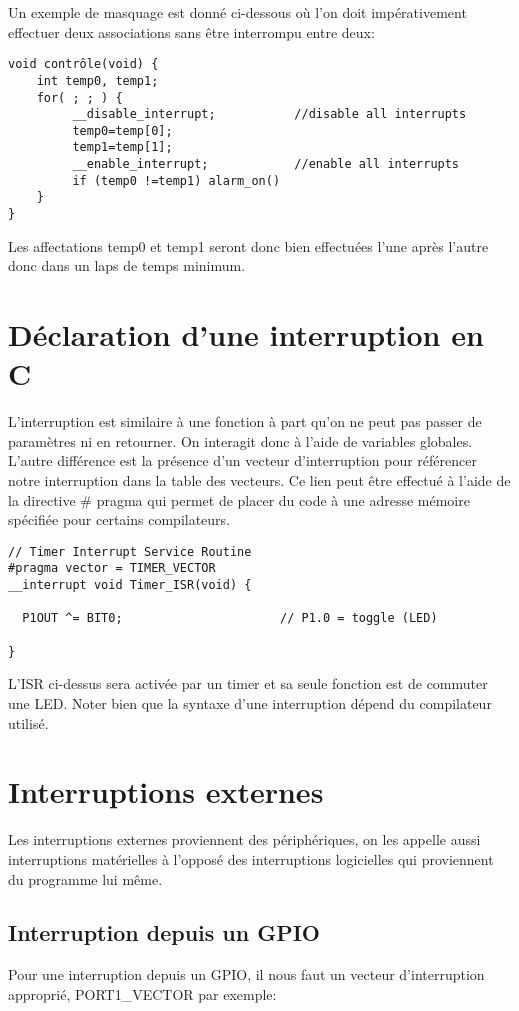 Un exemple de masquage est donné ci-dessous où l'on doit impérativement effectuer deux associations sans être interrompu entre deux:

\lstset{style=customc}
\begin{lstlisting}
void contrôle(void) {
    int temp0, temp1;
    for( ; ; ) {
         __disable_interrupt;			//disable all interrupts
         temp0=temp[0];
         temp1=temp[1];
         __enable_interrupt;			//enable all interrupts
         if (temp0 !=temp1) alarm_on()
    }
}
\end{lstlisting}

Les affectations temp0 et temp1 seront donc bien effectuées l'une après l'autre donc dans un laps de temps minimum.

\section{Déclaration d'une interruption en C}
L'interruption est similaire à une fonction à part qu'on ne peut pas passer de paramètres ni en retourner. On interagit donc à l'aide de variables globales. L'autre différence est la présence d'un vecteur d'interruption pour référencer notre interruption dans la table des vecteurs. Ce lien peut être effectué à l'aide de la directive \# pragma qui permet de placer du code à une adresse mémoire spécifiée pour certains compilateurs.

\lstset{style=customc}
\begin{lstlisting}
// Timer Interrupt Service Routine
#pragma vector = TIMER_VECTOR
__interrupt void Timer_ISR(void) {

  P1OUT ^= BIT0;                      // P1.0 = toggle (LED)
  
}
\end{lstlisting}

L'ISR ci-dessus sera activée par un timer et sa seule fonction est de commuter une LED. Noter bien que la syntaxe d'une interruption dépend du compilateur utilisé.

\section{Interruptions externes}
Les interruptions externes proviennent des périphériques, on les appelle aussi interruptions matérielles à l'opposé des interruptions logicielles qui proviennent du programme lui même.

\subsection{Interruption depuis un GPIO}
Pour une interruption depuis un GPIO, il nous faut un vecteur d'interruption approprié, PORT1\_VECTOR par exemple:

